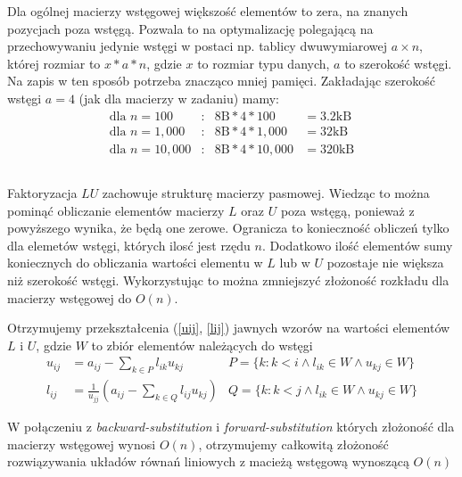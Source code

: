 \documentclass[11pt]{extarticle}
\begin{document}
	Dla ogólnej macierzy wstęgowej większość elementów to zera, na znanych pozycjach poza wstęgą.
	Pozwala to na optymalizację polegającą na przechowywaniu jedynie wstęgi w postaci np. tablicy dwuwymiarowej \(a\times n\),
	której rozmiar to \(x*a*n\), gdzie \(x\) to rozmiar typu danych, \(a\) to szerokość wstęgi.
	Na zapis w ten sposób potrzeba znacząco mniej pamięci. Zakładając szerokość wstęgi \(a=4\) (jak dla macierzy w zadaniu) mamy:
	\begin{align}
		\text{dla } n=100 &:& 8\text{B}*4*100 &= 3.2\text{kB} \\
		\text{dla } n=1,000 &:& 8\text{B}*4*1,000 &= 32\text{kB} \\
		\label{rozmiar_diag_N10000}
		\text{dla } n=10,000 &:& 8\text{B}*4*10,000 &= 320\text{kB}
	\end{align}

	\subsection{}
	Faktoryzacja \(LU\) zachowuje strukturę macierzy pasmowej.
	Wiedząc to można pominąć obliczanie elementów macierzy \(L\) oraz \(U\) poza wstęgą, ponieważ z powyższego wynika, że będą one zerowe.
	Ogranicza to konieczność obliczeń tylko dla elemetów wstęgi, których ilosć jest rzędu \(n\).	
	Dodatkowo ilość elementów sumy koniecznych do obliczania wartości elementu w \(L\) lub w \(U\) pozostaje nie większa niż szerokość wstęgi.
	Wykorzystując to można zmniejszyć złożoność rozkładu dla macierzy wstęgowej do \(O(n)\).
	
	Otrzymujemy przekształcenia (\ref{uij}, \ref{lij}) jawnych wzorów na wartości elementów \(L\) i \(U\),
	gdzie \(W\) to zbiór elementów należących do wstęgi
	\begin{align}
		\label{uij}
		u_{ij} &= a_{ij} - \sum_{k \in P} l_{ik}u_{kj}									&P = \{ k:  k<i \land l_{ik} \in W \land u_{kj} \in W \} \\
		\label{lij}
		l_{ij} &= \frac{1}{u_{jj}} \left( a_{ij} - \sum_{k \in Q} l_{ij}u_{kj} \right)  &Q = \{ k: k<j \land l_{ik} \in W \land u_{kj} \in W \} 
	\end{align}

	W połączeniu z \emph{backward-substitution} i \emph{forward-substitution} których złożoność dla macierzy wstęgowej wynosi \(O(n)\),
	otrzymujemy całkowitą złożoność rozwiązywania układów równań liniowych z macieżą wstęgową wynoszącą \(O(n)\)
\end{document}
